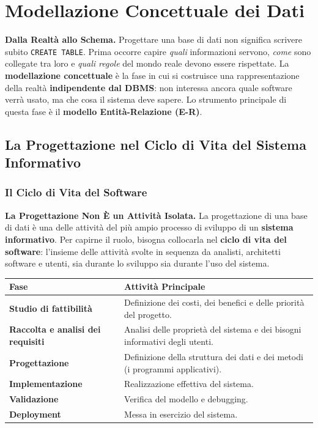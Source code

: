\documentclass[12pt]{extarticle}
\begin{document}
\newpage

\section{Modellazione Concettuale dei Dati}

\noindent \textbf{Dalla Realtà allo Schema.} Progettare una base di dati non significa scrivere subito \texttt{CREATE TABLE}. Prima occorre capire \textit{quali} informazioni servono, \textit{come} sono collegate tra loro e \textit{quali regole} del mondo reale devono essere rispettate. La \textbf{modellazione concettuale} è la fase in cui si costruisce una rappresentazione della realtà \textbf{indipendente dal DBMS}: non interessa ancora quale software verrà usato, ma che cosa il sistema deve sapere. Lo strumento principale di questa fase è il \textbf{modello Entità-Relazione (E-R)}.

\subsection{La Progettazione nel Ciclo di Vita del Sistema Informativo}

\subsubsection{Il Ciclo di Vita del Software}

\noindent \textbf{La Progettazione Non È un Attività Isolata.} La progettazione di una base di dati è una delle attività del più ampio processo di sviluppo di un \textbf{sistema informativo}. Per capirne il ruolo, bisogna collocarla nel \textbf{ciclo di vita del software}: l'insieme delle attività svolte in sequenza da analisti, architetti software e utenti, sia durante lo sviluppo sia durante l'uso del sistema.

\begin{center}
\small
\begin{tabular}{@{}L{6.0cm}L{8.8cm}@{}}
    \toprule
    \textbf{Fase} & \textbf{Attività Principale} \\
    \midrule
    \textbf{Studio di fattibilità} & Definizione dei costi, dei benefici e delle priorità del progetto. \\
    \addlinespace
    \textbf{Raccolta e analisi dei requisiti} & Analisi delle proprietà del sistema e dei bisogni informativi degli utenti. \\
    \addlinespace
    \textbf{Progettazione} & Definizione della struttura dei dati e dei metodi (i programmi applicativi). \\
    \addlinespace
    \textbf{Implementazione} & Realizzazione effettiva del sistema. \\
    \addlinespace
    \textbf{Validazione} & Verifica del modello e debugging. \\
    \addlinespace
    \textbf{Deployment} & Messa in esercizio del sistema. \\
    \bottomrule
\end{tabular}
\end{center}
\end{document}
